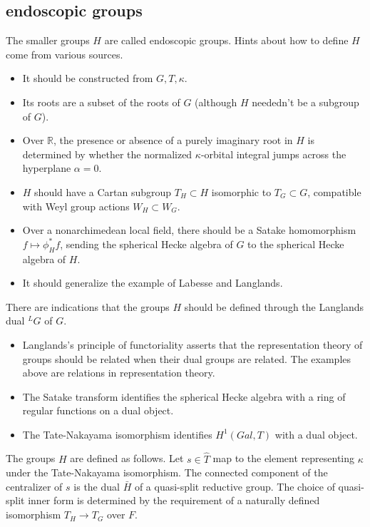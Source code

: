 \documentclass[brochure,english,12pt]{bourbaki}
\newcommand{\ring}[1]{\mathbb{#1}}
\begin{document}
\subsection{endoscopic groups}

The
smaller groups $H$ are called endoscopic groups.
Hints about how to define $H$ come from various sources.
\begin{itemize}
\item It should be constructed from $G,T,\kappa$.
\item Its roots are a subset of the roots of $G$ (although $H$ neededn't
be a subgroup of $G$).
\item Over $\ring{R}$, the presence or absence of a purely imaginary
root in $H$ is determined by whether the normalized $\kappa$-orbital
integral jumps across the hyperplane $\alpha=0$.
\item $H$ should have a Cartan subgroup $T_H\subset H$ isomorphic to
$T_G\subset G$, compatible with Weyl group actions $W_H\subset W_G$.
\item Over a nonarchimedean local field, there should be a Satake
homomorphism $f \mapsto \phi^*_Hf$, sending the spherical Hecke algebra
of $G$ to the spherical Hecke algebra of $H$.
\item It should generalize the example of Labesse and Langlands.
\end{itemize}

There are indications that the groups $H$ should be defined through  
the Langlands dual ${}^LG$ of $G$.
\begin{itemize}
\item Langlands's principle of functoriality asserts that the
  representation theory of groups should be related when their dual
  groups are related.  The examples above are relations in
  representation theory.
\item The Satake transform identifies the spherical Hecke algebra with
  a ring of regular functions on a dual object.
\item The Tate-Nakayama isomorphism identifies $H^1(Gal,T)$
with a dual object.
\end{itemize}

The groups $H$ are defined as follows.  Let $s\in \hat T$ map
to the element representing $\kappa$ under the Tate-Nakayama isomorphism.
The connected component of the centralizer of $s$ is the dual $\bar H$
of a quasi-split reductive group.  The choice of
quasi-split inner form is determined by the requirement of a naturally
defined isomorphism $T_H\to T_G$ over $F$.
\end{document}
